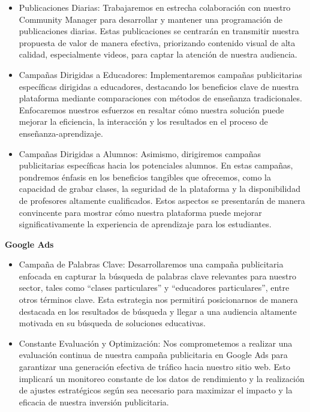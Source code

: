 \documentclass[
]{article}
\providecommand{\tightlist}{%
  \setlength{\itemsep}{0pt}\setlength{\parskip}{0pt}}
\begin{document}
\begin{itemize}
\tightlist
\item
  Publicaciones Diarias: Trabajaremos en estrecha colaboración con
  nuestro Community Manager para desarrollar y mantener una programación
  de publicaciones diarias. Estas publicaciones se centrarán en
  transmitir nuestra propuesta de valor de manera efectiva, priorizando
  contenido visual de alta calidad, especialmente videos, para captar la
  atención de nuestra audiencia.
\item
  Campañas Dirigidas a Educadores: Implementaremos campañas
  publicitarias específicas dirigidas a educadores, destacando los
  beneficios clave de nuestra plataforma mediante comparaciones con
  métodos de enseñanza tradicionales. Enfocaremos nuestros esfuerzos en
  resaltar cómo nuestra solución puede mejorar la eficiencia, la
  interacción y los resultados en el proceso de enseñanza-aprendizaje.
\item
  Campañas Dirigidas a Alumnos: Asimismo, dirigiremos campañas
  publicitarias específicas hacia los potenciales alumnos. En estas
  campañas, pondremos énfasis en los beneficios tangibles que ofrecemos,
  como la capacidad de grabar clases, la seguridad de la plataforma y la
  disponibilidad de profesores altamente cualificados. Estos aspectos se
  presentarán de manera convincente para mostrar cómo nuestra plataforma
  puede mejorar significativamente la experiencia de aprendizaje para
  los estudiantes.
\end{itemize}

\textbf{Google Ads}

\begin{itemize}
\tightlist
\item
  Campaña de Palabras Clave: Desarrollaremos una campaña publicitaria
  enfocada en capturar la búsqueda de palabras clave relevantes para
  nuestro sector, tales como ``clases particulares'' y ``educadores
  particulares'', entre otros términos clave. Esta estrategia nos
  permitirá posicionarnos de manera destacada en los resultados de
  búsqueda y llegar a una audiencia altamente motivada en su búsqueda de
  soluciones educativas.
\item
  Constante Evaluación y Optimización: Nos comprometemos a realizar una
  evaluación continua de nuestra campaña publicitaria en Google Ads para
  garantizar una generación efectiva de tráfico hacia nuestro sitio web.
  Esto implicará un monitoreo constante de los datos de rendimiento y la
  realización de ajustes estratégicos según sea necesario para maximizar
  el impacto y la eficacia de nuestra inversión publicitaria.
\end{itemize}
\end{document}
